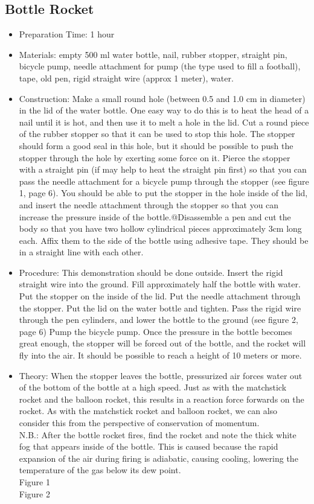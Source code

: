 \subsection{Bottle Rocket}
\begin{itemize}
\item{Preparation Time: 1 hour}
\item{Materials: empty 500 ml water bottle, nail, rubber stopper, straight pin, bicycle pump, needle attachment for pump (the type used to fill a football), tape, old pen, rigid straight wire (approx 1 meter), water.}
\item{Construction: Make a small round hole (between 0.5 and 1.0 cm in diameter) in the lid of the water bottle. One easy way to do this is to heat the head of a nail until it is hot, and then use it to melt a hole in the lid. Cut a round piece of the rubber stopper so that it can be used to stop this hole. The stopper should form a good seal in this hole, but it should be possible to push the stopper through the hole by exerting some force on it. Pierce the stopper with a straight pin (if may help to heat the straight pin first) so that you can pass the needle attachment for a bicycle pump through the stopper (see figure 1, page 6). You should be able to put the stopper in the hole inside of the lid, and insert the needle attachment through the stopper so that you can increase the pressure inside of the bottle.@Disassemble a pen and cut the body so that you have two hollow cylindrical pieces approximately 3cm long each. Affix them to the side of the bottle using adhesive tape. They should be in a straight line with each other.}
\item{Procedure: This demonstration should be done outside. Insert the rigid straight wire into the ground. Fill approximately half the bottle with water. Put the stopper on the inside of the lid. Put the needle attachment through the stopper. Put the lid on the water bottle and tighten. Pass the rigid wire through the pen cylinders, and lower the bottle to the ground (see figure 2, page 6) Pump the bicycle pump. Once the pressure in the bottle becomes great enough, the stopper will be forced out of the bottle, and the rocket will fly into the air. It should be possible to reach a height of 10 meters or more.}
\item{Theory: When the stopper leaves the bottle, pressurized air forces water out of the bottom of the bottle at a high speed. Just as with the matchstick rocket and the balloon rocket, this results in a reaction force forwards on the rocket. As with the matchstick rocket and balloon rocket, we can also consider this from the perspective of conservation of momentum.\\
N.B.: After the bottle rocket fires, find the rocket and note the thick white fog that appears inside of the bottle. This is caused because the rapid expansion of the air during firing is adiabatic, causing cooling, lowering the temperature of the gas below its dew point.\\
Figure 1\\
Figure 2}
\end{itemize}


